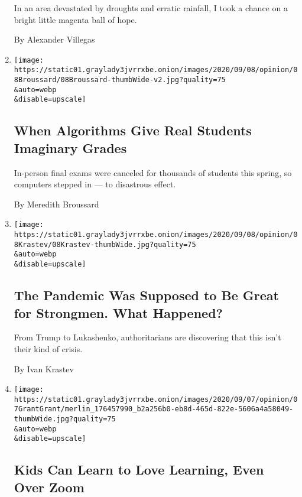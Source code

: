 \begin{enumerate}
  In an area devastated by droughts and erratic rainfall, I took a
  chance on a bright little magenta ball of hope.

  By Alexander Villegas
\item
  \href{/2020/09/08/opinion/international-baccalaureate-algorithm-grades.html}{}

  \texttt{[image: https://static01.graylady3jvrrxbe.onion/images/2020/09/08/opinion/08Broussard/08Broussard-thumbWide-v2.jpg?quality=75\\\&auto=webp\\\&disable=upscale]}

  \hypertarget{when-algorithms-give-real-students-imaginary-grades}{%
  \subsection{When Algorithms Give Real Students Imaginary
  Grades}\label{when-algorithms-give-real-students-imaginary-grades}}

  In-person final exams were canceled for thousands of students this
  spring, so computers stepped in --- to disastrous effect.

  By Meredith Broussard
\item
  \href{/2020/09/08/opinion/coronavirus-dictatorships.html}{}

  \texttt{[image: https://static01.graylady3jvrrxbe.onion/images/2020/09/08/opinion/08Krastev/08Krastev-thumbWide.jpg?quality=75\\\&auto=webp\\\&disable=upscale]}

  \hypertarget{the-pandemic-was-supposed-to-be-great-for-strongmen-what-happened}{%
  \subsection{The Pandemic Was Supposed to Be Great for Strongmen. What
  Happened?}\label{the-pandemic-was-supposed-to-be-great-for-strongmen-what-happened}}

  From Trump to Lukashenko, authoritarians are discovering that this
  isn't their kind of crisis.

  By Ivan Krastev
\item
  \href{/2020/09/07/opinion/remote-school.html}{}

  \texttt{[image: https://static01.graylady3jvrrxbe.onion/images/2020/09/07/opinion/07GrantGrant/merlin\_176457990\_b2a256b0-eb8d-465d-822e-5606a4a58049-thumbWide.jpg?quality=75\\\&auto=webp\\\&disable=upscale]}

  \hypertarget{kids-can-learn-to-love-learning-even-over-zoom}{%
  \subsection{Kids Can Learn to Love Learning, Even Over
  Zoom}\label{kids-can-learn-to-love-learning-even-over-zoom}}


\end{enumerate}
